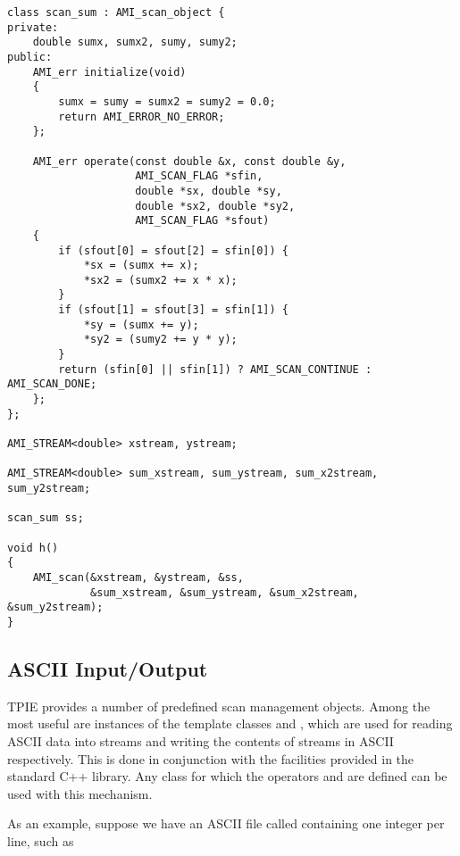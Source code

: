 \begin{verbatim}
class scan_sum : AMI_scan_object {
private:
    double sumx, sumx2, sumy, sumy2;
public:
    AMI_err initialize(void)
    {
        sumx = sumy = sumx2 = sumy2 = 0.0;
        return AMI_ERROR_NO_ERROR;
    };

    AMI_err operate(const double &x, const double &y, 
                    AMI_SCAN_FLAG *sfin,
                    double *sx, double *sy, 
                    double *sx2, double *sy2, 
                    AMI_SCAN_FLAG *sfout)
    {
        if (sfout[0] = sfout[2] = sfin[0]) {
            *sx = (sumx += x);
            *sx2 = (sumx2 += x * x);
        }
        if (sfout[1] = sfout[3] = sfin[1]) {
            *sy = (sumx += y);
            *sy2 = (sumy2 += y * y);
        }        
        return (sfin[0] || sfin[1]) ? AMI_SCAN_CONTINUE : AMI_SCAN_DONE;
    };
};

AMI_STREAM<double> xstream, ystream;

AMI_STREAM<double> sum_xstream, sum_ystream, sum_x2stream, sum_y2stream;

scan_sum ss;

void h()
{
    AMI_scan(&xstream, &ystream, &ss, 
             &sum_xstream, &sum_ystream, &sum_x2stream, &sum_y2stream);
}
\end{verbatim}

\subsection{ASCII Input/Output} 

TPIE provides a number of predefined scan management objects.  Among
the most useful are instances of the template classes
 and , which are
used for reading ASCII data into streams and writing the contents of
streams in ASCII respectively.  This is done in conjunction with the
 facilities provided in the standard C++ library.  Any
class  for which the operators  and 
are defined can be used with this mechanism.

As an example, suppose we have an ASCII file called 
containing one integer per line, such as

